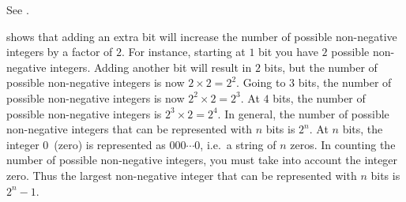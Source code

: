 \documentclass[a4paper,oneside,12pt]{article}
\begin{document}
\begin{problem}
{\begin{solution}
See .

\begin{table}[!htbp]
\centering

\caption{%
  The number of non-negative integers that can be represented with a
  given number of bits.  Going from left to right, the third column
  contains the consecutive growth factors.  Starting from the row with
  two bits downwards, the growth factor for the row is defined as the
  number of non-negative integers that can be represented with $n$
  bits divided by the number of non-negative integers that can be
  represented with $n - 1$ bits.  The right-most column contains the
  largest non-negative integer that can be represented with $n$ bits.
}
\label{tab:exponential:binary_how_many_integers}
\end{table}

 shows that adding an
extra bit will increase the number of possible non-negative integers
by a factor of $2$.  For instance, starting at $1$ bit you have $2$
possible non-negative integers.  Adding another bit will result in $2$
bits, but the number of possible non-negative integers is now
$2 \times 2 = 2^2$.  Going to $3$ bits, the number of possible
non-negative integers is now $2^2 \times 2 = 2^3$.  At $4$ bits, the
number of possible non-negative integers is $2^3 \times 2 = 2^4$.  In
general, the number of possible non-negative integers that can be
represented with $n$ bits is $2^n$.  At $n$ bits, the integer
$0$~(zero) is represented as $000 \cdots 0$, i.e.~a string of $n$
zeros.  In counting the number of possible non-negative integers, you
must take into account the integer zero.  Thus the largest
non-negative integer that can be represented with $n$ bits is
$2^n - 1$.
\end{solution}
}{}


\end{problem}
\end{document}
